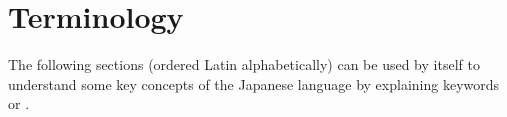 \chapter{Terminology}
\label{chap:Terminology}
\label{sec:Terminology}

The following sections (ordered Latin alphabetically) can be used by itself to
understand some key concepts of the Japanese language by explaining keywords
or .


